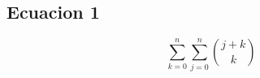 \documentclass{article}
\begin{document}
\begin{center}
\begin{tikzpicture}
        \end{tikzpicture}

    \end{center}


    \subsection*{Ecuacion 1} 
    \begin{equation*}
        \displaystyle \sum_{k = 0}^{n} \sum_{j = 0}^{n} \binom{j+k}{k}    
    \end{equation*}
\end{document}
